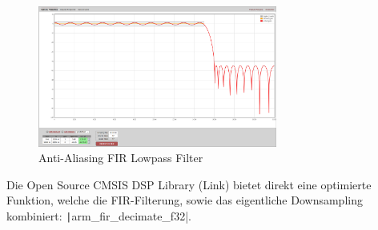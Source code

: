 \begin{figure}[h!]
	\centering
	\includegraphics[width=0.7\textwidth]{images/08_durchfuehrung/audio/fir_lowpass.png}
	\caption{Anti-Aliasing FIR Lowpass Filter}
	\label{fig:fir-filter}
\end{figure}

Die Open Source CMSIS DSP Library (Link) bietet direkt eine optimierte Funktion, welche die FIR-Filterung, sowie das eigentliche Downsampling kombiniert: \texttt|arm_fir_decimate_f32|.


